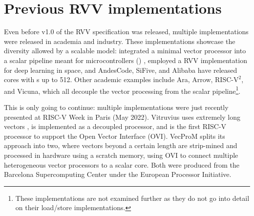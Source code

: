 \section{Previous RVV implementations\label{chap:bg:rvvend}}
Even before v1.0 of the RVV specification was released, multiple implementations were released in academia and industry.
These implementations showcase the diversity allowed by a scalable model: \citeauthor{johnsMinimalRISCVVector2020} integrated a minimal vector processor into a scalar pipeline meant for microcontrollers () \cite{johnsMinimalRISCVVector2020}, \citeauthor{dimascioOnBoardDecisionMaking2021} employed a RVV implementation for deep learning in space\cite{dimascioOnBoardDecisionMaking2021}, and AndesCode, SiFive, and Alibaba have released cores with s up to 512\cite{AndesCoreNX27VProcessor}.
Other academic examples include Ara\cite{cavalcanteAra1GHzScalable2020}, Arrow\cite{assirArrowRISCVVector2021}, RISC-$\text{V}^2$\cite{patsidisRISCV2ScalableRISCV2020}, and Vicuna\cite{platzerVicunaTimingPredictableRISCV2021}, which all decouple the vector processing from the scalar pipeline\footnote{These implementations are not examined further as they do not go into detail on their load/store implementations.}.

This is only going to continue: multiple implementations were just recently presented at RISC-V Week in Paris (May 2022).
Vitruvius\cite{minerviniVitruviusAreaEfficientRISCV2022} uses extremely long vectors , is implemented as a decoupled processor, and is the first RISC-V processor to support the Open Vector Interface (OVI)\cite{semidynamicsSemidynamicsOpenVectorInterface2022}.
VecProM\cite{mahaleRISCVVPUVery2021} splits its approach into two, where vectors beyond a certain length are strip-mined and processed in hardware using a scratch memory, using OVI to connect multiple heterogeneous vector processors to a scalar core.
Both were produced from the Barcelona Supercomputing Center under the European Processor Initiative.

